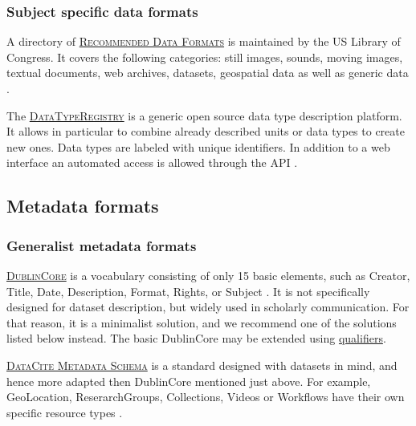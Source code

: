 \subsubsection{Subject specific data formats}

\noindent A directory of   \textsc{\href{http://www.digitalpreservation.gov/formats/}{Recommended Data Formats}} is maintained by the US Library of Congress. It covers the following categories: still images, sounds, moving images, textual documents, web archives, datasets, geospatial data as well as generic data \cite{libraryofcongress_sustainability_2015}.

\vspace{0.4cm}

\noindent The  \textsc{\href{http://www.typeregistry.org/registrar/}{DataTypeRegistry}} is a generic open source data type description platform. It allows in particular to combine already described units or data types to create new ones. Data types are labeled with unique identifiers. In addition to a web interface an automated access is allowed through the API \cite{datatyperegistry_data_2015}.

\subsection{Metadata formats}
\label{metadata_formats}

\subsubsection{Generalist metadata formats}
\noindent {} \textsc{\href{http://dublincore.org/documents/dces/}{DublinCore}} is a vocabulary consisting of only 15 basic elements, such as Creator, Title, Date, Description, Format, Rights, or Subject \cite{dublincore_dublin_3013}. It is not specifically designed for dataset description, but widely used in scholarly communication. For that reason, it is a minimalist solution, and we recommend one of the solutions listed below instead. The basic DublinCore may be extended using \href{http://dublincore.org/documents/2000/07/11/dcmes-qualifiers/}{qualifiers}. 

\vspace{0.4cm}

\noindent {} \textsc{\href{https://schema.datacite.org/}{DataCite Metadata Schema}} is a standard designed with datasets in mind, and hence more adapted then DublinCore mentioned just above. For example, GeoLocation, ReserarchGroups, Collections, Videos or Workflows have their own specific resource types \cite{datacite_datacite_2015}.

